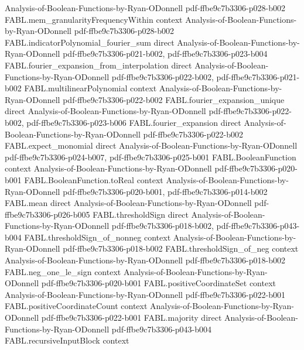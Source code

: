 \begin{theorem}
  {Analysis-of-Boolean-Functions-by-Ryan-ODonnell}
  {pdf-ffbe9c7b3306-p028-b002}
\proofstep
  {FABL.mem_granularityFrequencyWithin}
  {context}
  {Analysis-of-Boolean-Functions-by-Ryan-ODonnell}
  {pdf-ffbe9c7b3306-p028-b002}
\proofstep
  {FABL.indicatorPolynomial_fourier_sum}
  {direct}
  {Analysis-of-Boolean-Functions-by-Ryan-ODonnell}
  {pdf-ffbe9c7b3306-p021-b002,
    pdf-ffbe9c7b3306-p023-b004}
\proofstep
  {FABL.fourier_expansion_from_interpolation}
  {direct}
  {Analysis-of-Boolean-Functions-by-Ryan-ODonnell}
  {pdf-ffbe9c7b3306-p022-b002,
    pdf-ffbe9c7b3306-p021-b002}
\proofstep
  {FABL.multilinearPolynomial}
  {context}
  {Analysis-of-Boolean-Functions-by-Ryan-ODonnell}
  {pdf-ffbe9c7b3306-p022-b002}
\proofstep
  {FABL.fourier_expansion_unique}
  {direct}
  {Analysis-of-Boolean-Functions-by-Ryan-ODonnell}
  {pdf-ffbe9c7b3306-p022-b002,
    pdf-ffbe9c7b3306-p023-b006}
\proofstep
  {FABL.fourier_expansion}
  {direct}
  {Analysis-of-Boolean-Functions-by-Ryan-ODonnell}
  {pdf-ffbe9c7b3306-p022-b002}
\proofstep
  {FABL.expect_monomial}
  {direct}
  {Analysis-of-Boolean-Functions-by-Ryan-ODonnell}
  {pdf-ffbe9c7b3306-p024-b007,
    pdf-ffbe9c7b3306-p025-b001}
\proofstep
  {FABL.BooleanFunction}
  {context}
  {Analysis-of-Boolean-Functions-by-Ryan-ODonnell}
  {pdf-ffbe9c7b3306-p020-b001}
\proofstep
  {FABL.BooleanFunction.toReal}
  {context}
  {Analysis-of-Boolean-Functions-by-Ryan-ODonnell}
  {pdf-ffbe9c7b3306-p020-b001,
    pdf-ffbe9c7b3306-p014-b002}
\proofstep
  {FABL.mean}
  {direct}
  {Analysis-of-Boolean-Functions-by-Ryan-ODonnell}
  {pdf-ffbe9c7b3306-p026-b005}
\proofstep
  {FABL.thresholdSign}
  {direct}
  {Analysis-of-Boolean-Functions-by-Ryan-ODonnell}
  {pdf-ffbe9c7b3306-p018-b002,
    pdf-ffbe9c7b3306-p043-b004}
\proofstep
  {FABL.thresholdSign_of_nonneg}
  {context}
  {Analysis-of-Boolean-Functions-by-Ryan-ODonnell}
  {pdf-ffbe9c7b3306-p018-b002}
\proofstep
  {FABL.thresholdSign_of_neg}
  {context}
  {Analysis-of-Boolean-Functions-by-Ryan-ODonnell}
  {pdf-ffbe9c7b3306-p018-b002}
\proofstep
  {FABL.neg_one_le_sign}
  {context}
  {Analysis-of-Boolean-Functions-by-Ryan-ODonnell}
  {pdf-ffbe9c7b3306-p020-b001}
\proofstep
  {FABL.positiveCoordinateSet}
  {context}
  {Analysis-of-Boolean-Functions-by-Ryan-ODonnell}
  {pdf-ffbe9c7b3306-p022-b001}
\proofstep
  {FABL.positiveCoordinateCount}
  {context}
  {Analysis-of-Boolean-Functions-by-Ryan-ODonnell}
  {pdf-ffbe9c7b3306-p022-b001}
\proofstep
  {FABL.majority}
  {direct}
  {Analysis-of-Boolean-Functions-by-Ryan-ODonnell}
  {pdf-ffbe9c7b3306-p043-b004}
\proofstep
  {FABL.recursiveInputBlock}
  {context}

\end{theorem}
